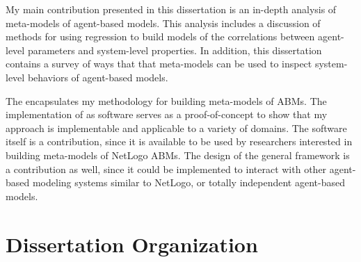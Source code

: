 My main contribution presented in this dissertation is an in-depth analysis of meta-models of agent-based models.
This analysis includes a discussion of methods for using regression to build models of the correlations between agent-level parameters and system-level properties. 
In addition, this dissertation contains a survey of ways that that meta-models can be used to inspect system-level behaviors of agent-based models.

The \framework encapsulates my methodology for building meta-models of ABMs.
The implementation of \fw as software serves as a proof-of-concept to show that my approach is implementable and applicable to a variety of domains.
The software itself is a contribution, since it is available to be used by researchers interested in building meta-models of NetLogo ABMs.
The design of the general framework is a contribution as well, since it could be implemented to interact with other agent-based modeling systems similar to NetLogo, or totally independent agent-based models.


\section{Dissertation Organization}

